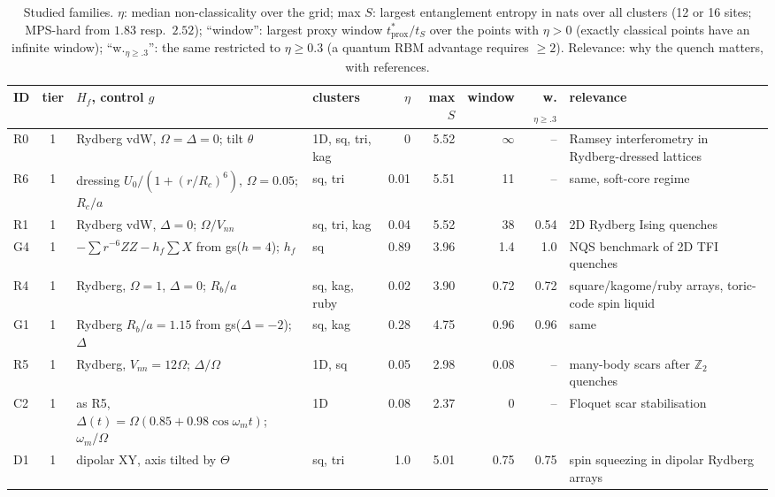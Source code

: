 \documentclass[11pt,a4paper]{article}
\newcommand{\tprox}{t^*_{\mathrm{prox}}}
\begin{document}
\begin{table}[p]
  \centering
  \caption{Studied families. $\eta$: median non-classicality over the grid; max $S$: largest entanglement
    entropy in nats over all clusters (12 or 16 sites; MPS-hard from $1.83$ resp.\ $2.52$); ``window'': largest proxy window $\tprox/t_S$ over the points with $\eta>0$ (exactly
    classical points have an infinite window); ``w.$_{\eta\ge.3}$'': the same restricted to $\eta\ge0.3$ (a quantum RBM advantage
    requires $\ge2$). Relevance: why the quench matters, with references.}
  \label{tab:families}
  \scriptsize
  \setlength{\tabcolsep}{3pt}
  \begin{tabular}{lcp{3.9cm}lrrrrp{4.2cm}}
    \toprule
    ID & tier & $H_f$, control $g$ & clusters & $\eta$ & max $S$ & window & w.$_{\eta\ge.3}$ & relevance\\
    \midrule
    R0 & 1 & Rydberg vdW, $\Omega=\Delta=0$; tilt $\theta$ & 1D, sq, tri, kag & 0 & 5.52 & $\infty$ & -- & Ramsey interferometry in Rydberg-dressed lattices~\cite{Zeiher16,Zeiher17,Borish20}\\
    R6 & 1 & dressing $U_0/(1+(r/R_c)^6)$, $\Omega=0.05$; $R_c/a$ & sq, tri & 0.01 & 5.51 & 11 & -- & same, soft-core regime~\cite{Zeiher16,Zeiher17}\\
    R1 & 1 & Rydberg vdW, $\Delta=0$; $\Omega/V_{nn}$ & sq, tri, kag & 0.04 & 5.52 & 38 & 0.54 & 2D Rydberg Ising quenches~\cite{Lienhard18,GuardadoSanchez18}\\
    G4 & 1 & $-\sum r^{-6}ZZ-h_f\sum X$ from gs($h=4$); $h_f$ & sq & 0.89 & 3.96 & 1.4 & 1.0 & NQS benchmark of 2D TFI quenches~\cite{SchmittHeyl20}\\
    R4 & 1 & Rydberg, $\Omega=1$, $\Delta=0$; $R_b/a$ & sq, kag, ruby & 0.02 & 3.90 & 0.72 & 0.72 & square/kagome/ruby arrays, toric-code spin liquid~\cite{Ebadi21,Scholl21,Samajdar20,Semeghini21,Verresen21}\\
    G1 & 1 & Rydberg $R_b/a=1.15$ from gs($\Delta=-2$); $\Delta$ & sq, kag & 0.28 & 4.75 & 0.96 & 0.96 & same~\cite{Ebadi21}\\
    R5 & 1 & Rydberg, $V_{nn}=12\Omega$; $\Delta/\Omega$ & 1D, sq & 0.05 & 2.98 & 0.08 & -- & many-body scars after $\mathbb Z_2$ quenches~\cite{Bernien17,Turner18}\\
    C2 & 1 & as R5, $\Delta(t)=\Omega(0.85+0.98\cos\omega_mt)$; $\omega_m/\Omega$ & 1D & 0.08 & 2.37 & 0 & -- & Floquet scar stabilisation~\cite{Bluvstein21}\\
    D1 & 1 & dipolar XY, axis tilted by $\Theta$ & sq, tri & 1.0 & 5.01 & 0.75 & 0.75 & spin squeezing in dipolar Rydberg arrays~\cite{Bornet23,deLeseleuc19}\\

\end{tabular}
\end{table}
\end{document}
